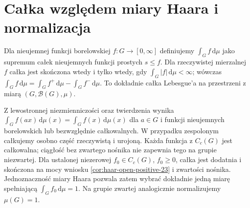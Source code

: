 \section{Całka względem miary Haara i normalizacja}
\begin{definicja}\label{def:haar-integral-23}
Dla nieujemnej funkcji borelowskiej $f:G\to[0,\infty]$ definiujemy $\int_G f\,\mathrm d\mu$ jako supremum całek nieujemnych funkcji prostych $s\le f$. Dla rzeczywistej mierzalnej $f$ całka jest skończona wtedy i tylko wtedy, gdy $\int_G|f|\,\mathrm d\mu<\infty$; wówczas $\int_Gf\,\mathrm d\mu=\int_Gf^+\,\mathrm d\mu-\int_Gf^-\,\mathrm d\mu$. To dokładnie całka Lebesgue'a na przestrzeni z miarą $(G,\mathcal B(G),\mu)$.
\end{definicja}
Z lewostronnej niezmienniczości oraz twierdzenia
 wynika
$\int_G f(ax)\,\mathrm d\mu(x)=\int_Gf(x)\,\mathrm d\mu(x)$
dla $a\in G$ i funkcji nieujemnych borelowskich lub
bezwzględnie całkowalnych. W przypadku zespolonym
całkujemy osobno część rzeczywistą i urojoną. Każda funkcja z $C_c(G)$ jest całkowalna; ciągłość bez zwartego nośnika nie zapewnia tego na grupie niezwartej.
Dla ustalonej niezerowej $f_0\in C_c(G)$, $f_0\ge0$, całka jest dodatnia i skończona na mocy wniosku \ref{cor:haar-open-positive-23} i zwartości nośnika. Jednoznaczność miary Haara pozwala zatem wybrać dokładnie jedną miarę spełniającą $\int_G f_0\,\mathrm d\mu=1$. Na grupie zwartej analogicznie normalizujemy $\mu(G)=1$.

